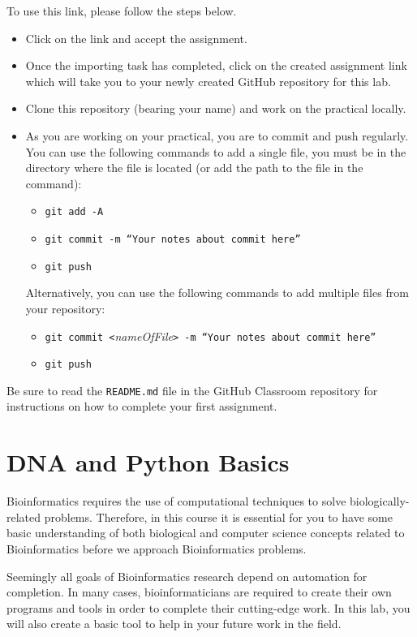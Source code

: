 To use this link, please follow the steps below.
\begin{itemize}
	\item Click on the link and accept the assignment.
	\item Once the importing task has completed, click on the created assignment link which will take you to your newly created GitHub repository for this lab.
	\item Clone this repository (bearing your name) and work on the practical locally.
	\item As you are working on your practical, you are to commit and push regularly. You can use the following commands to add a single file, you must be in the directory where the file is located (or add the path to the file in the command):
		\begin{itemize}
		\item {\tt git add -A}
		\item {\tt git commit -m ``Your notes about commit here''}
		\item {\tt git push}
	\end{itemize}

	Alternatively, you can use the following commands to add multiple files from your repository:
	\begin{itemize}
		\item {\tt git commit <}\emph{nameOfFile}\tt{> -m ``Your notes about commit here''}
		\item {\tt git push}
	\end{itemize}
\end{itemize}

Be sure to read the {\tt README.md} file in the GitHub Classroom repository for instructions on how to complete your first assignment.


\section*{DNA and Python Basics}

Bioinformatics requires the use of computational techniques to solve biologically-related problems. Therefore, in this course it is essential for you to have some basic understanding of both biological 
and computer science concepts related to Bioinformatics before we approach Bioinformatics problems. 

Seemingly all goals of Bioinformatics research depend on automation for completion. In many cases, bioinformaticians are required to create their own programs and tools in order to complete their cutting-edge work. In this lab, you will also create a basic tool to help in your future work in the field. 

